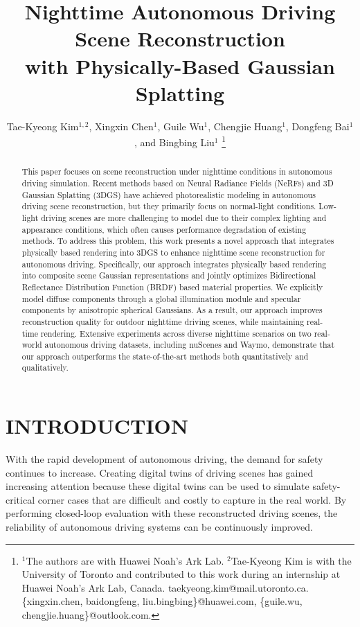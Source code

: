 \documentclass[letterpaper, 10 pt, conference]{ieeeconf}  %
\title{\LARGE \bf
Nighttime Autonomous Driving Scene Reconstruction \\ with Physically-Based Gaussian Splatting
}
\author{Tae-Kyeong Kim$^{1,2}$, Xingxin Chen$^{1}$, Guile Wu$^{1}$, Chengjie Huang$^{1}$, Dongfeng Bai$^{1}$, and Bingbing Liu$^{1}$ 
\thanks{$^{1}$The authors are with Huawei Noah's Ark Lab.
$^{2}$Tae-Kyeong Kim is with the University of Toronto and contributed to this work during an internship at Huawei Noah's Ark Lab, Canada.
taekyeong.kim@mail.utoronto.ca.
{\{xingxin.chen, baidongfeng, liu.bingbing\}@huawei.com},
{\{guile.wu, chengjie.huang\}@outlook.com}.%
}
}
\begin{document}
\maketitle
\thispagestyle{empty}
\pagestyle{empty}


\begin{abstract}
This paper focuses on scene reconstruction under nighttime conditions in autonomous driving simulation.
Recent methods based on Neural Radiance Fields (NeRFs) and 3D Gaussian Splatting (3DGS) have achieved photorealistic modeling in autonomous driving scene reconstruction, but they primarily focus on normal-light conditions.
Low-light driving scenes are more challenging to model due to their complex lighting and appearance conditions, which often causes performance degradation of existing methods.
To address this problem, this work presents a novel approach that integrates physically based rendering into 3DGS to enhance nighttime scene reconstruction for autonomous driving.
Specifically, our approach integrates physically based rendering into composite scene Gaussian representations and jointly optimizes Bidirectional Reflectance Distribution Function (BRDF) based material properties.
We explicitly model diffuse components through a global illumination module and specular components by anisotropic spherical Gaussians.
As a result, our approach improves reconstruction quality for outdoor nighttime driving scenes, while maintaining real-time rendering.
Extensive experiments across diverse nighttime scenarios on two real-world autonomous driving datasets, including nuScenes and Waymo, demonstrate that our approach outperforms the state-of-the-art methods both quantitatively and qualitatively.
\end{abstract}


\section{INTRODUCTION}

With the rapid development of autonomous driving, the demand for safety continues to increase.
Creating digital twins of driving scenes has gained increasing attention because these digital twins can be used to simulate safety-critical corner cases that are difficult and costly to capture in the real world.
By performing closed-loop evaluation with these reconstructed driving scenes, the reliability of autonomous driving systems can be continuously improved.
\end{document}

